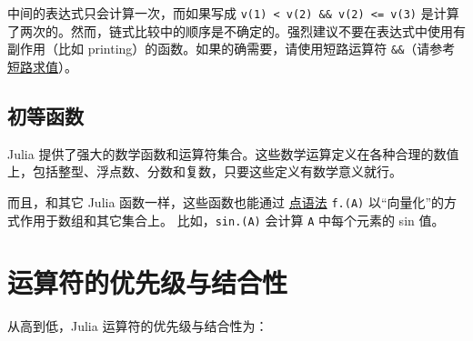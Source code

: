 中间的表达式只会计算一次，而如果写成 \texttt{v(1) < v(2) \&\& v(2) <= v(3)} 是计算了两次的。然而，链式比较中的顺序是不确定的。强烈建议不要在表达式中使用有副作用（比如 printing）的函数。如果的确需要，请使用短路运算符 \texttt{\&\&}（请参考\hyperlink{7551496361738057869}{短路求值}）。



\hypertarget{6116621209452494602}{}


\subsection{初等函数}



Julia 提供了强大的数学函数和运算符集合。这些数学运算定义在各种合理的数值上，包括整型、浮点数、分数和复数，只要这些定义有数学意义就行。



而且，和其它 Julia 函数一样，这些函数也能通过 \hyperlink{17801130558550430478}{点语法} \texttt{f.(A)} 以“向量化”的方式作用于数组和其它集合上。 比如，\texttt{sin.(A)} 会计算 \texttt{A} 中每个元素的 sin 值。



\hypertarget{1086128937891391302}{}


\section{运算符的优先级与结合性}



从高到低，Julia 运算符的优先级与结合性为：




